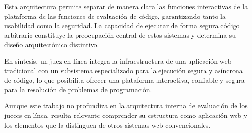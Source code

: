 Esta arquitectura permite separar de manera clara las funciones interactivas de la plataforma de las funciones de evaluación de código, garantizando tanto la usabilidad como la seguridad. La capacidad de ejecutar de forma segura código arbitrario constituye la preocupación central de estos sistemas y determina su diseño arquitectónico distintivo.

En síntesis, un juez en línea integra la infraestructura de una aplicación web tradicional con un subsistema especializado para la ejecución segura y asíncrona de código, lo que posibilita ofrecer una plataforma interactiva, confiable y segura para la resolución de problemas de programación.

Aunque este trabajo no profundiza en la arquitectura interna de evaluación de los jueces en línea, resulta relevante comprender su estructura como aplicación web y los elementos que la distinguen de otros sistemas web convencionales.


